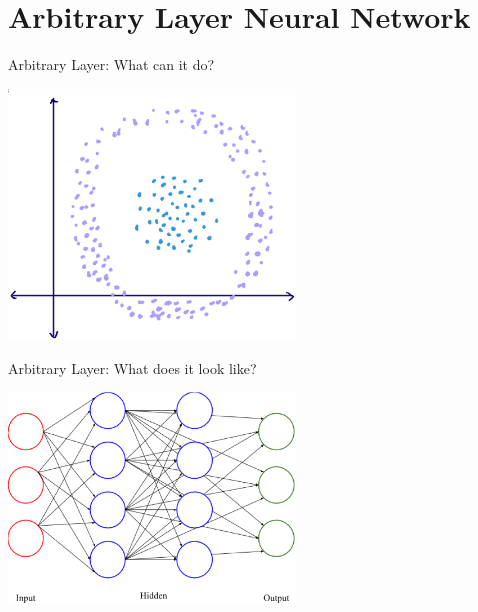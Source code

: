 \documentclass{beamer}
\begin{document}
  \section{Arbitrary Layer Neural Network}
  \begin{frame}{Arbitrary Layer: What can it do?}
    \begin{center}
      \includegraphics[width=3in]{../figures/arbitrary.eps}
    \end{center}
  \end{frame}

  \begin{frame}{Arbitrary Layer: What does it look like?}
    \begin{center}
      \includegraphics[width=3in]{../figures/deep_nn.eps}
    \end{center}
  \end{frame}

\end{document}
